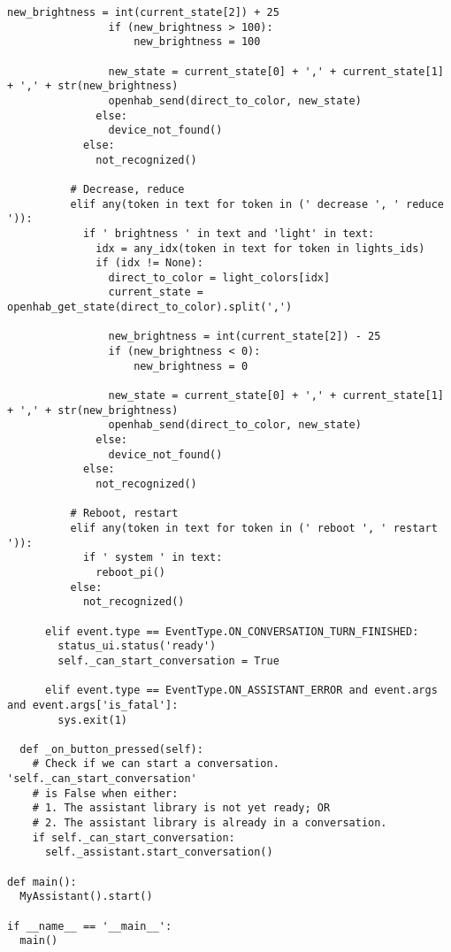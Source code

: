 \begin{lstlisting}[style=PythonCode]
                new_brightness = int(current_state[2]) + 25
                if (new_brightness > 100):
                    new_brightness = 100

                new_state = current_state[0] + ',' + current_state[1] + ',' + str(new_brightness)
                openhab_send(direct_to_color, new_state)
              else:
                device_not_found()
            else:
              not_recognized()

          # Decrease, reduce
          elif any(token in text for token in (' decrease ', ' reduce ')):
            if ' brightness ' in text and 'light' in text:
              idx = any_idx(token in text for token in lights_ids)
              if (idx != None):
                direct_to_color = light_colors[idx]
                current_state = openhab_get_state(direct_to_color).split(',')

                new_brightness = int(current_state[2]) - 25
                if (new_brightness < 0):
                    new_brightness = 0

                new_state = current_state[0] + ',' + current_state[1] + ',' + str(new_brightness)
                openhab_send(direct_to_color, new_state)
              else:
                device_not_found()
            else:
              not_recognized()

          # Reboot, restart
          elif any(token in text for token in (' reboot ', ' restart ')):
            if ' system ' in text:
              reboot_pi()
          else:
            not_recognized()

      elif event.type == EventType.ON_CONVERSATION_TURN_FINISHED:
        status_ui.status('ready')
        self._can_start_conversation = True

      elif event.type == EventType.ON_ASSISTANT_ERROR and event.args and event.args['is_fatal']:
        sys.exit(1)

  def _on_button_pressed(self):
    # Check if we can start a conversation. 'self._can_start_conversation'
    # is False when either:
    # 1. The assistant library is not yet ready; OR
    # 2. The assistant library is already in a conversation.
    if self._can_start_conversation:
      self._assistant.start_conversation()

def main():
  MyAssistant().start()

if __name__ == '__main__':
  main()
\end{lstlisting}
